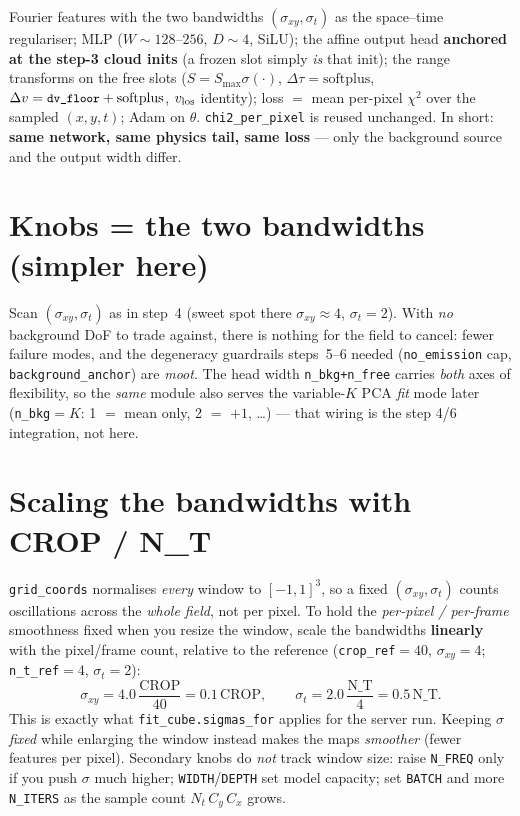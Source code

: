 \documentclass[10pt,a4paper]{article}
\newcommand{\co}[1]{{\small\texttt{#1}}}
\begin{document}
Fourier features with the two bandwidths $(\sigma_{xy},\sigma_t)$ as the space--time regulariser; MLP ($W\!\sim\!128$--$256$, $D\!\sim\!4$, SiLU); the affine output head \textbf{anchored at the step-3 cloud inits} (a frozen slot simply \emph{is} that init); the range transforms on the free slots ($S=S_{\max}\sigma(\cdot)$, $\Delta\tau=\mathrm{softplus}$, $\Delta v=\co{dv\_floor}+\mathrm{softplus}$, $v_{\rm los}$ identity); loss $=$ mean per-pixel $\chi^2$ over the sampled $(x,y,t)$; Adam on $\theta$. \co{chi2\_per\_pixel} is reused unchanged. In short: \textbf{same network, same physics tail, same loss} --- only the background source and the output width differ.

\section{Knobs = the two bandwidths (simpler here)}

Scan $(\sigma_{xy},\sigma_t)$ as in step~4 (sweet spot there $\sigma_{xy}\!\approx\!4$, $\sigma_t\!=\!2$). With \emph{no} background DoF to trade against, there is nothing for the field to cancel: fewer failure modes, and the degeneracy guardrails steps~5--6 needed (\co{no\_emission} cap, \co{background\_anchor}) are \emph{moot}. The head width \co{n\_bkg+n\_free} carries \emph{both} axes of flexibility, so the \emph{same} module also serves the variable-$K$ PCA \emph{fit} mode later (\co{n\_bkg}$=K$: 1 $=$ mean only, 2 $=$ $+1$, \ldots) --- that wiring is the step 4/6 integration, not here.

\section{Scaling the bandwidths with CROP / N\_T}

\co{grid\_coords} normalises \emph{every} window to $[-1,1]^3$, so a fixed $(\sigma_{xy},\sigma_t)$ counts oscillations across the \emph{whole field}, not per pixel. To hold the \emph{per-pixel / per-frame} smoothness fixed when you resize the window, scale the bandwidths \textbf{linearly} with the pixel/frame count, relative to the reference (\co{crop\_ref}$=40$, $\sigma_{xy}=4$; \co{n\_t\_ref}$=4$, $\sigma_t=2$):
\[
\sigma_{xy}=4.0\,\frac{\mathrm{CROP}}{40}=0.1\,\mathrm{CROP},\qquad
\sigma_{t}=2.0\,\frac{\mathrm{N\_T}}{4}=0.5\,\mathrm{N\_T}.
\]
This is exactly what \co{fit\_cube.sigmas\_for} applies for the server run. Keeping $\sigma$ \emph{fixed} while enlarging the window instead makes the maps \emph{smoother} (fewer features per pixel). Secondary knobs do \emph{not} track window size: raise \co{N\_FREQ} only if you push $\sigma$ much higher; \co{WIDTH}/\co{DEPTH} set model capacity; set \co{BATCH} and more \co{N\_ITERS} as the sample count $N_t\,C_y\,C_x$ grows.
\end{document}
